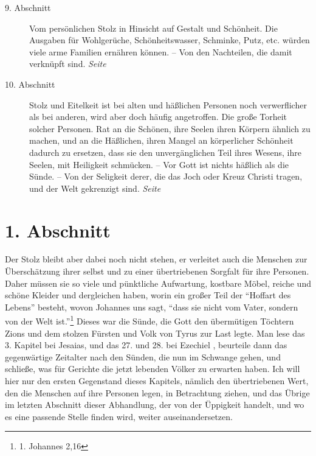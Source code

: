 \begin{description}
\item[9. Abschnitt] Vom persönlichen Stolz in Hinsicht auf Gestalt und
Schönheit. Die Ausgaben für Wohlgerüche, Schönheitswasser, Schminke, Putz, etc.
würden viele arme Familien ernähren können. -- Von den Nachteilen, die damit
verknüpft sind.
\dotfill \textit{Seite~\pageref{kap11_ab9}}\\
\item[10. Abschnitt] Stolz und Eitelkeit ist bei alten und häßlichen Personen
noch verwerflicher als bei anderen, wird aber doch häufig angetroffen. Die große
Torheit solcher Personen. Rat an die Schönen, ihre Seelen ihren Körpern
ähnlich zu machen, und an die Häßlichen, ihren Mangel an körperlicher Schönheit
dadurch zu ersetzen, dass sie den unvergänglichen Teil ihres Wesens, ihre
Seelen, mit Heiligkeit schmücken. -- Vor Gott ist nichts häßlich als die Sünde.
-- Von der Seligkeit derer, die das Joch oder Kreuz Christi tragen, und der Welt
gekrenzigt sind.
\dotfill \textit{Seite~\pageref{kap11_ab10}}\\

\end{description}

\newpage

\section{1. Abschnitt} \label{kap11_ab1}

Der Stolz bleibt aber dabei noch nicht stehen, er verleitet auch die Menschen
zur Überschätzung ihrer selbst und zu einer übertriebenen Sorgfalt für ihre
Personen. Daher müssen sie so viele und pünktliche Aufwartung, kostbare
Möbel,
reiche und schöne Kleider und dergleichen haben, worin ein
großer Teil
der "`Hoffart
des Lebens"' besteht, wovon Johannes uns sagt,
"`dass sie nicht vom Vater,
sondern von der Welt ist."'\footnote{1. Johannes 2,16}
Dieses war die Sünde, die Gott
den übermütigen Töchtern Zions und dem stolzen
Fürsten und Volk von Tyrus zur
Last legte. Man lese das 3. Kapitel bei Jesaias, und das 27. und 28. bei
Ezechiel ,
beurteile dann das gegenwärtige Zeitalter nach den Sünden, die nun im
Schwange gehen, und schließe, was für Gerichte die jetzt lebenden Völker zu
erwarten haben. Ich will hier nur den ersten Gegenstand dieses Kapitels, nämlich
den übertriebenen Wert, den die Menschen auf ihre Personen legen, in
Betrachtung ziehen, und das Übrige im letzten Abschnitt dieser Abhandlung, der
von der Üppigkeit handelt, und wo es eine passende Stelle finden wird,
weiter auseinandersetzen.

